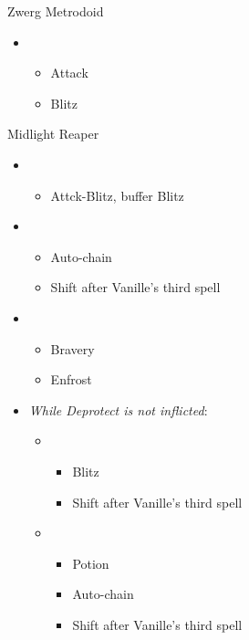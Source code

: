 \begin{multicols}{2}
	\begin{battle}[0:05]{Zwerg Metrodoid}
		\begin{itemize}
			\item \first
			      \begin{itemize}
				      \item Attack
				      \item Blitz
			      \end{itemize}
		\end{itemize}
	\end{battle}

	\begin{battle}[1:10]{Midlight Reaper}
		\begin{itemize}
			\item \first
			      \begin{itemize}
				      \item Attck-Blitz, buffer Blitz
			      \end{itemize}
			\item \fifth
			      \begin{itemize}
				      \item Auto-chain
				      \item Shift after Vanille's third spell
			      \end{itemize}
			\item \third
			      \begin{itemize}
				      \item Bravery
				      \item Enfrost
			      \end{itemize}
			\item \textit{While Deprotect is not inflicted}:
			      \begin{itemize}
				      \item \sixth
				            \begin{itemize}
					            \item Blitz
					            \item Shift after Vanille's third spell
				            \end{itemize}
				      \item \fifth
				            \begin{itemize}
					            \item Potion
					            \item Auto-chain
					            \item Shift after Vanille's third spell

\end{itemize}
\end{itemize}
\end{itemize}
\end{battle}
\end{multicols}
